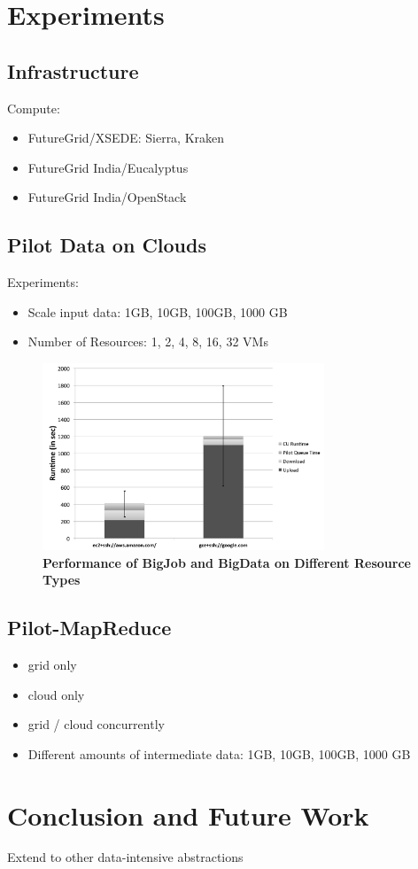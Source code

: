 \documentclass[times]{cpeauth}
\begin{document}
\section{Experiments}

\subsection{Infrastructure}

Compute:
\begin{itemize}
	\item FutureGrid/XSEDE: Sierra, Kraken 
	\item FutureGrid India/Eucalyptus
	\item FutureGrid India/OpenStack
\end{itemize}

	
\subsection{Pilot Data on Clouds}

Experiments:
\begin{itemize}
	\item  Scale input data: 1GB, 10GB, 100GB, 1000 GB
	\item  Number of Resources: 1, 2, 4, 8, 16, 32 VMs
\end{itemize}


\begin{figure}[htbp]
	\centering
		\includegraphics[width=0.75\textwidth]{performance/pd_google_aws.pdf}
	\caption{\textbf{Performance of BigJob and BigData on Different Resource Types}}
	\label{fig:performance_pd_google_aws}
\end{figure}




\subsection{Pilot-MapReduce}
\begin{itemize}
	\item grid only
	\item cloud only
	\item grid / cloud concurrently
	\item  Different amounts of intermediate data: 1GB, 10GB, 100GB, 1000 GB	
\end{itemize}

\section{Conclusion and Future Work}

Extend to other data-intensive abstractions



\end{document}
